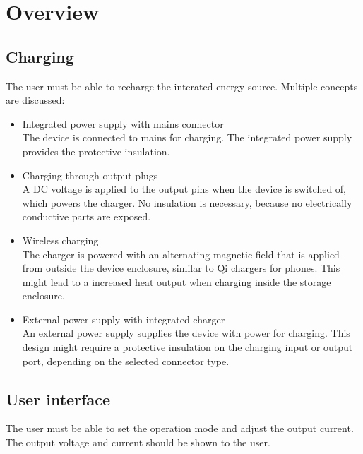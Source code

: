 \section{Overview}
\label{sec:overview}

\subsection{Charging}
The user must be able to recharge the interated energy source. Multiple concepts are discussed: 

\begin{itemize}
    \item Integrated power supply with mains connector
        \\
        The device is connected to mains for charging. The integrated power supply provides the protective insulation. 
    \item Charging through output plugs
        \\
        A DC voltage is applied to the output pins when the device is switched of, which powers the charger. No insulation is necessary, because no electrically conductive parts are exposed. 
    \item Wireless charging
        \\
        The charger is powered with an alternating magnetic field that is applied from outside the device enclosure, similar to Qi chargers for phones. This might lead to a increased heat output when charging inside the storage enclosure. 
    \item External power supply with integrated charger
        \\
        An external power supply supplies the device with power for charging. This design might require a protective insulation on the charging input or output port, depending on the selected connector type. 
\end{itemize}

\subsection{User interface}
The user must be able to set the operation mode and adjust the output current. The output voltage and current should be shown to the user. 

